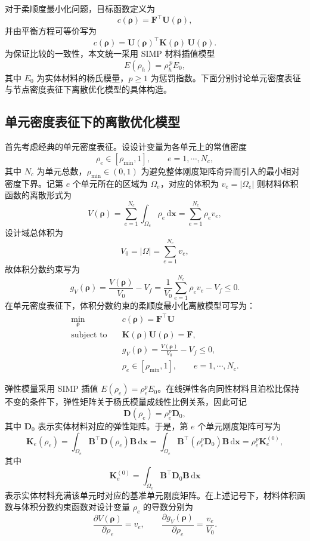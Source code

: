 对于柔顺度最小化问题，目标函数定义为
\[
c(\boldsymbol{\rho})=\boldsymbol{F}^{\top}\boldsymbol{U}(\boldsymbol{\rho}),
\]
并由平衡方程可等价写为
\[
c(\boldsymbol{\rho})=\boldsymbol{U}(\boldsymbol{\rho})^{\top}\boldsymbol{K}(\boldsymbol{\rho})\,\boldsymbol{U}(\boldsymbol{\rho}).
\]
为保证比较的一致性，本文统一采用 SIMP 材料插值模型
\[
E(\rho_h)=\rho_h^{\,p}E_0,
\]
其中 $E_0$ 为实体材料的杨氏模量，$p\ge 1$ 为惩罚指数。下面分别讨论单元密度表征与节点密度表征下离散优化模型的具体构造。


\subsection{单元密度表征下的离散优化模型}
\label{subsec:cell_density_rep}

首先考虑经典的单元密度表征。设设计变量为各单元上的常值密度
\[
\rho_e\in[\rho_{\min},1],\qquad e=1,\cdots,N_c,
\]
其中 $N_c$ 为单元总数，$\rho_{\min}\in(0,1)$ 为避免整体刚度矩阵奇异而引入的最小相对密度下界。记第 $e$ 个单元所在的区域为 $\Omega_e$，对应的体积为 $v_e=|\Omega_e|$ 则材料体积函数的离散形式为
\[
V(\boldsymbol{\rho})=\sum_{e=1}^{N_c}\int_{\Omega_e}\rho_e\,\mathrm{d}\boldsymbol{x} =\sum_{e=1}^{N_c}\rho_e v_e,
\]
设计域总体积为
\[
V_0=|\Omega|=\sum_{e=1}^{N_c}v_e,
\]
故体积分数约束写为
\[
g_V(\boldsymbol{\rho}) =\frac{V(\boldsymbol{\rho})}{V_0}-V_f =\frac{1}{V_0}\sum_{e=1}^{N_c}\rho_e v_e - V_f \le 0.
\]
在单元密度表征下，体积分数约束的柔顺度最小化离散模型可写为：
\begin{equation} \label{eq:ch3_discrete_model_cell}
	\begin{aligned} 
		\min_{\boldsymbol{\rho}}\quad & c(\boldsymbol{\rho})=\boldsymbol{F}^{\top}\boldsymbol{U}\\ 
		\text{subject to}\quad & \boldsymbol{K}(\boldsymbol{\rho})\boldsymbol{U}(\boldsymbol{\rho})=\boldsymbol{F},\\ 
		& g_V(\boldsymbol{\rho}) = \frac{V(\boldsymbol{\rho})}{V_0} - V_f \le 0,\\ 
		& \rho_e\in[\rho_{\min},1],\qquad e=1,\cdots,N_c. 
	\end{aligned}
\end{equation}

弹性模量采用 SIMP 插值 $E(\rho_e) = \rho_e^pE_0$。在线弹性各向同性材料且泊松比保持不变的条件下，弹性矩阵关于杨氏模量成线性比例关系，因此可记
\[
\boldsymbol D(\rho_e)=\rho_e^p\boldsymbol D_0,
\]
其中 $\boldsymbol D_0$ 表示实体材料对应的弹性矩阵。于是，第 $e$ 个单元刚度矩阵可写为
\[
\boldsymbol{K}_e(\rho_e) = \int_{\Omega_e}\boldsymbol{B}^{\top}\boldsymbol{D}(\rho_e)\boldsymbol{B}\,\mathrm{d}\boldsymbol{x} = \int_{\Omega_e}\boldsymbol{B}^{\top}(\rho_e^p\boldsymbol{D}_0)\boldsymbol{B}\,\mathrm{d}\boldsymbol{x} = \rho_e^p\boldsymbol{K}_e^{(0)},
\]
其中
\[
\boldsymbol K_e^{(0)}=\int_{\Omega_e}\boldsymbol B^{\top}\boldsymbol D_0\boldsymbol B\,\mathrm d\boldsymbol x
\]
表示实体材料充满该单元时对应的基准单元刚度矩阵。在上述记号下，材料体积函数与体积分数约束函数对设计变量 $\rho_e$ 的导数分别为
\[
\frac{\partial V(\boldsymbol{\rho})}{\partial\rho_e}=v_e, \qquad \frac{\partial g_V(\boldsymbol{\rho})}{\partial\rho_e}=\frac{v_e}{V_0}.
\]

